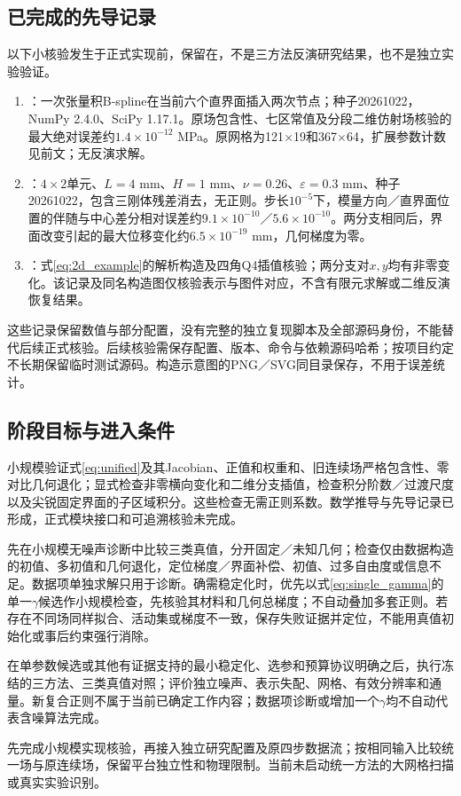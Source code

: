\documentclass[11pt,a4paper]{ctexart}
\begin{document}
\subsection{已完成的先导记录}
以下小核验发生于正式实现前，保留在，不是三方法反演研究结果，也不是独立实验验证。
\begin{enumerate}
\item {}：一次张量积B-spline在当前六个直界面插入两次节点；种子20261022，NumPy 2.4.0、SciPy 1.17.1。原场包含性、七区常值及分段二维仿射场核验的最大绝对误差约$1.4\times10^{-12}$ MPa。原网格为121$\times$19和367$\times$64，扩展参数计数见前文；无反演求解。
\item {}：$4\times2$单元、$L=4$ mm、$H=1$ mm、$\nu=0.26$、$\varepsilon=0.3$ mm、种子20261022，包含三刚体残差消去，无正则。步长$10^{-5}$下，模量方向／直界面位置的伴随与中心差分相对误差约$9.1\times10^{-10}$／$5.6\times10^{-10}$。两分支相同后，界面改变引起的最大位移变化约$6.5\times10^{-19}$ mm，几何梯度为零。
\item {}：式\eqref{eq:2d_example}的解析构造及四角Q4插值核验；两分支对$x,y$均有非零变化。该记录及同名构造图仅核验表示与图件对应，不含有限元求解或二维反演恢复结果。
\end{enumerate}
这些记录保留数值与部分配置，没有完整的独立复现脚本及全部源码身份，不能替代后续正式核验。后续核验需保存配置、版本、命令与依赖源码哈希；按项目约定不长期保留临时测试源码。构造示意图的PNG／SVG同目录保存，不用于误差统计。

\subsection{阶段目标与进入条件}
\begin{description}[style=nextline]
\item[P0：表示、积分和导数]
小规模验证式\eqref{eq:unified}及其Jacobian、正值和权重和、旧连续场严格包含性、零对比几何退化；显式检查非零横向变化和二维分支插值，检查积分阶数／过渡尺度以及尖锐固定界面的子区域积分。这些检查无需正则系数。数学推导与先导记录已形成，正式模块接口和可追溯核验未完成。
\item[P1：最小反演原型]
先在小规模无噪声诊断中比较三类真值，分开固定／未知几何；检查仅由数据构造的初值、多初值和几何退化，定位梯度／界面补偿、初值、过多自由度或信息不足。数据项单独求解只用于诊断。确需稳定化时，优先以式\eqref{eq:single_gamma}的单一$\gamma$候选作小规模检查，先核验其材料和几何总梯度；不自动叠加多套正则。若存在不同场同样拟合、活动集或梯度不一致，保存失败证据并定位，不能用真值初始化或事后约束强行消除。
\item[P2：正式数值对照]
在单参数候选或其他有证据支持的最小稳定化、选参和预算协议明确之后，执行冻结的三方法、三类真值对照；评价独立噪声、表示失配、网格、有效分辨率和通量。新复合正则不属于当前已确定工作内容；数据项诊断或增加一个$\gamma$均不自动代表含噪算法完成。
\item[P3：分层DIC与独立标定]
先完成小规模实现核验，再接入独立研究配置及原四步数据流；按相同输入比较统一场与原连续场，保留平台独立性和物理限制。当前未启动统一方法的大网格扫描或真实实验识别。
\end{description}
\end{document}
